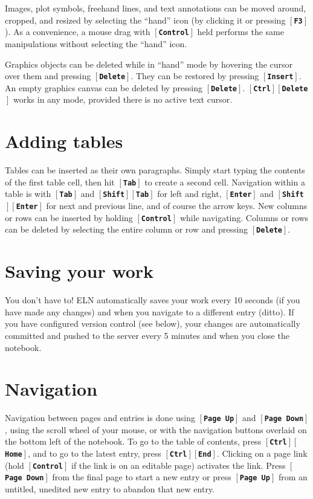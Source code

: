 \documentclass[11pt]{report}
\def\keystroke#1{$\left[\right.\!${\tt\bfseries #1}$\!\left.\right]$}
\def\key#1{\keystroke{#1}}
\def\keycombo#1#2{\keystroke{#1}\keystroke{#2}}
\def\keycontrol#1{\keycombo{Ctrl}{#1}}
\def\keyshift#1{\keycombo{Shift}{#1}}
\begin{document}
Images, plot symbols, freehand lines, and text annotations can be
moved around, cropped, and resized by selecting the ``hand'' icon (by
clicking it or pressing \key{F3}). As a convenience, a mouse drag with
\key{Control} held performs the same manipulations without selecting the
``hand'' icon.

Graphics objects can be deleted while in ``hand'' mode by hovering the
cursor over them and pressing \key{Delete}. They can be restored by
pressing \key{Insert}. An empty graphics canvas can be deleted by
pressing \key{Delete}. \keycontrol{Delete} works in any mode,
provided there is no active text cursor.

\section{Adding tables}

Tables can be inserted as their own paragraphs. Simply start typing
the contents of the first table cell, then hit \key{Tab} to create a
second cell. Navigation within a table is with \key{Tab} and
\keyshift{Tab} for left and right, \key{Enter} and
\keyshift{Enter} for next and previous line, and of course the
arrow keys. New columns or rows can be inserted by holding \key{Control}
while navigating. Columns or rows can be deleted by selecting the
entire column or row and pressing \key{Delete}.

\section{Saving your work}

You don't have to! ELN automatically saves your work every 10 seconds
(if you have made any changes) and when you navigate to a different
entry (ditto). If you have configured version control (see below),
your changes are automatically committed and pushed to the server
every 5 minutes and when you close the
notebook.

\section{Navigation}

Navigation between pages and entries is done using \key{Page Up} and
\key{Page Down}, using the scroll wheel of your mouse, or with the
navigation buttons overlaid on the bottom left of the notebook. To go
to the table of contents, press \keycontrol{Home}, and to go to the
latest entry, press \keycontrol{End}. Clicking on a page link (hold
\key{Control} if the link is on an editable page) activates the
link. Press \key{Page Down} from the final page to start a new entry or
press \key{Page Up} from an untitled, unedited new entry to abandon that
new entry.
\end{document}
